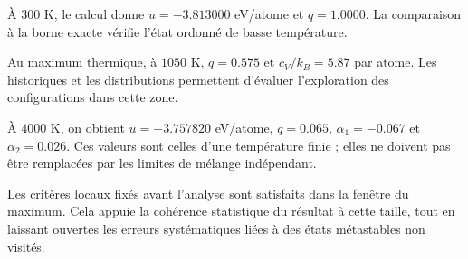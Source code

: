 À $300$ K, le calcul donne $u=-3.813000$ eV/atome et $q=1.0000$. La comparaison à la borne exacte vérifie l'état ordonné de basse température.

Au maximum thermique, à $1050$ K, $q=0.575$ et $c_V/k_B=5.87$ par atome. Les historiques et les distributions permettent d'évaluer l'exploration des configurations dans cette zone.

À $4000$ K, on obtient $u=-3.757820$ eV/atome, $q=0.065$, $\alpha_1=-0.067$ et $\alpha_2=0.026$. Ces valeurs sont celles d'une température finie ; elles ne doivent pas être remplacées par les limites de mélange indépendant.

Les critères locaux fixés avant l'analyse sont satisfaits dans la fenêtre du maximum. Cela appuie la cohérence statistique du résultat à cette taille, tout en laissant ouvertes les erreurs systématiques liées à des états métastables non visités.
